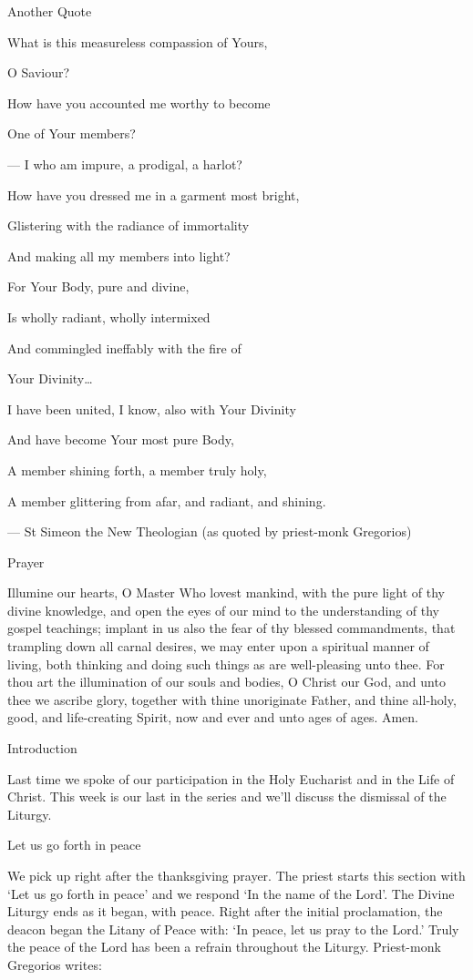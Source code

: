 \documentclass[
]{article}
\begin{document}
Another Quote

What is this measureless compassion of Yours,

O Saviour?

How have you accounted me worthy to become

One of Your members?

--- I who am impure, a prodigal, a harlot?

How have you dressed me in a garment most bright,

Glistering with the radiance of immortality

And making all my members into light?

For Your Body, pure and divine,

Is wholly radiant, wholly intermixed

And commingled ineffably with the fire of

Your Divinity\ldots{}

I have been united, I know, also with Your Divinity

And have become Your most pure Body,

A member shining forth, a member truly holy,

A member glittering from afar, and radiant, and shining.

--- St Simeon the New Theologian (as quoted by priest-monk Gregorios)

Prayer

Illumine our hearts, O Master Who lovest mankind, with the pure light of
thy divine knowledge, and open the eyes of our mind to the understanding
of thy gospel teachings; implant in us also the fear of thy blessed
commandments, that trampling down all carnal desires, we may enter upon
a spiritual manner of living, both thinking and doing such things as are
well-pleasing unto thee. For thou art the illumination of our souls and
bodies, O Christ our God, and unto thee we ascribe glory, together with
thine unoriginate Father, and thine all-holy, good, and life-creating
Spirit, now and ever and unto ages of ages. Amen.

Introduction

Last time we spoke of our participation in the Holy Eucharist and in the
Life of Christ. This week is our last in the series and we'll discuss
the dismissal of the Liturgy.

Let us go forth in peace

We pick up right after the thanksgiving prayer. The priest starts this
section with `Let us go forth in peace' and we respond `In the name of
the Lord'. The Divine Liturgy ends as it began, with peace. Right after
the initial proclamation, the deacon began the Litany of Peace with: `In
peace, let us pray to the Lord.' Truly the peace of the Lord has been a
refrain throughout the Liturgy. Priest-monk Gregorios writes:
\end{document}
